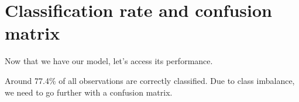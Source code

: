 \documentclass[]{book}
\newenvironment{Shaded}{\begin{snugshade}}{\end{snugshade}}
\newcommand{\CommentTok}[1]{\textcolor[rgb]{0.56,0.35,0.01}{\textit{#1}}}
\newcommand{\FloatTok}[1]{\textcolor[rgb]{0.00,0.00,0.81}{#1}}
\newcommand{\KeywordTok}[1]{\textcolor[rgb]{0.13,0.29,0.53}{\textbf{#1}}}
\newcommand{\NormalTok}[1]{#1}
\newcommand{\OperatorTok}[1]{\textcolor[rgb]{0.81,0.36,0.00}{\textbf{#1}}}
\begin{document}
\hypertarget{classification-rate-and-confusion-matrix}{%
\section{Classification rate and confusion matrix}\label{classification-rate-and-confusion-matrix}}

Now that we have our model, let's access its performance.

\begin{Shaded}
\end{Shaded}

Around 77.4\% of all observations are correctly classified. Due to class imbalance, we need to go further with a confusion matrix.
\end{document}
